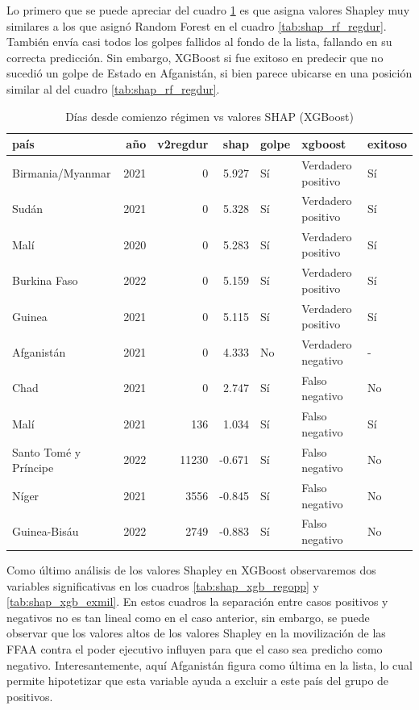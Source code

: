 \documentclass{article}
\begin{document}
Lo primero que se puede apreciar del cuadro \ref{tab:shap_xgb_regdur} es que asigna valores Shapley
muy similares a los que asignó Random Forest en el cuadro \ref{tab:shap_rf_regdur}. También envía casi
todos los golpes fallidos al fondo de la lista, fallando en su correcta predicción. Sin embargo,
XGBoost si fue exitoso en predecir que no sucedió un golpe de Estado en Afganistán, si bien parece
ubicarse en una posición similar al del cuadro \ref{tab:shap_rf_regdur}.

\begin{table}[H]
  \centering
  \begin{tabular}{lrrrlll}
    \toprule
    país & año & v2regdur & shap & golpe & xgboost & exitoso \\
    \midrule
    Birmania/Myanmar & 2021 & 0 & 5.927 & Sí & Verdadero positivo & Sí \\
    Sudán & 2021 & 0 & 5.328 & Sí & Verdadero positivo & Sí \\
    Malí & 2020 & 0 & 5.283 & Sí & Verdadero positivo & Sí \\
    Burkina Faso & 2022 & 0 & 5.159 & Sí & Verdadero positivo & Sí \\
    Guinea & 2021 & 0 & 5.115 & Sí & Verdadero positivo & Sí \\
    Afganistán & 2021 & 0 & 4.333 & No & Verdadero negativo & - \\
    Chad & 2021 & 0 & 2.747 & Sí & Falso negativo & No \\
    Malí & 2021 & 136 & 1.034 & Sí & Falso negativo & Sí \\
    Santo Tomé y Príncipe & 2022 & 11230 & -0.671 & Sí & Falso negativo & No \\
    Níger & 2021 & 3556 & -0.845 & Sí & Falso negativo & No \\
    Guinea-Bisáu & 2022 & 2749 & -0.883 & Sí & Falso negativo & No \\
    \bottomrule
    \end{tabular}
    \caption{Días desde comienzo régimen vs valores SHAP (XGBoost) \label{tab:shap_xgb_regdur}}
  \end{table}

Como último análisis de los valores Shapley en XGBoost observaremos dos variables significativas en
los cuadros \ref{tab:shap_xgb_regopp} y \ref{tab:shap_xgb_exmil}. En estos cuadros la separación entre
casos positivos y negativos no es tan lineal como en el caso anterior, sin embargo, se puede observar
que los valores altos de los valores Shapley en la movilización de las FFAA contra el poder ejecutivo
influyen para que el caso sea predicho como negativo. Interesantemente, aquí Afganistán figura como 
última en la lista, lo cual permite hipotetizar que esta variable ayuda a excluir a este país del grupo
de positivos.
\end{document}
